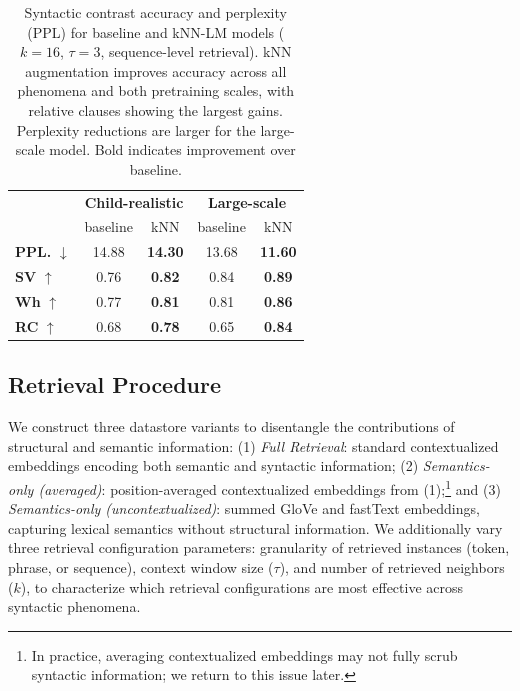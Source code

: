 \begin{table}
\vspace{-5pt}
\caption{Syntactic contrast accuracy and perplexity (PPL) for baseline and kNN-LM models ($k=16$, $\tau=3$, sequence-level retrieval). kNN augmentation improves accuracy across all phenomena and both pretraining scales, with relative clauses showing the largest gains. Perplexity reductions are larger for the large-scale model. Bold indicates improvement over baseline.}
\vspace{6pt}
\label{tab:general_effects}
\centering
\small
\begin{tabular}{lcccc}
\toprule
\textbf{} & \multicolumn{2}{c}{\textbf{Child-realistic}} & 
\multicolumn{2}{c}{\textbf{Large-scale}} \\
 & baseline & kNN & baseline & kNN \\
\midrule
\textbf{PPL.} $\downarrow$ & 14.88 & \textbf{14.30} & 13.68 & \textbf{11.60} \\
\textbf{SV} $\uparrow$     & 0.76  & \textbf{0.82}  & 0.84  & \textbf{0.89} \\
\textbf{Wh} $\uparrow$     & 0.77  & \textbf{0.81}  & 0.81  & \textbf{0.86} \\
\textbf{RC} $\uparrow$     & 0.68  & \textbf{0.78}  & 0.65  & \textbf{0.84} \\
\bottomrule
\end{tabular}
\vspace{-5pt}
\end{table}

\subsection{Retrieval Procedure}
\label{subsec:datastores}

We construct three datastore variants to disentangle the contributions of structural and semantic information: (1) \textit{Full Retrieval}: standard contextualized embeddings encoding both semantic and syntactic information; (2) \textit{Semantics-only (averaged)}: position-averaged contextualized embeddings from (1);\footnote{In practice, averaging contextualized embeddings may not fully scrub syntactic information; we return to this issue later.} and (3) \textit{Semantics-only (uncontextualized)}: summed GloVe \citep{pennington2014glove} and fastText \citep{bojanowski2017enriching} embeddings, capturing lexical semantics without structural information. We additionally vary three retrieval configuration parameters: granularity of retrieved instances (token, phrase, or sequence), context window size ($\tau$), and number of retrieved neighbors ($k$), to characterize which retrieval configurations are most effective across syntactic phenomena.



